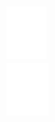 \documentclass[10pt]{article}
\begin{document}
\includegraphics[max width=\textwidth, center]{2025_04_17_46e04c6acd873ea9558dg-231(5)}\\
\includegraphics[max width=\textwidth, center]{2025_04_17_46e04c6acd873ea9558dg-231(2)}\\
\end{document}
